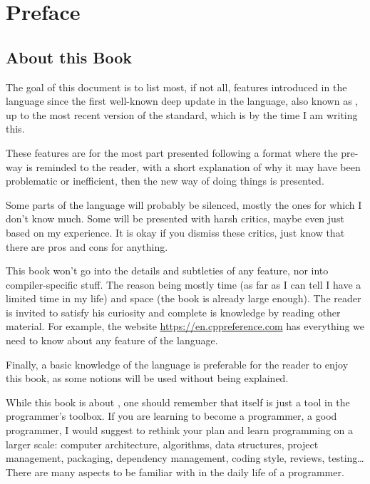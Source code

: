 \chapter{Preface}
\renewcommand*\thesection{\arabic{section}}

\section{About this Book}
The goal of this document is to list most, if not all, features
introduced in the \cpp{} language since the first well-known deep
update in the language, also known as , up to the most recent
version of the standard, which is  by the time I am writing
this.

These features are for the most part presented following a format
where the pre- way is reminded to the reader, with a short
explanation of why it may have been problematic or inefficient, then
the new way of doing things is presented.

Some parts of the language will probably be silenced, mostly the ones
for which I don't know much. Some will be presented with harsh
critics, maybe even just based on my experience. It is okay if you
dismiss these critics, just know that there are pros and cons for
anything.

This book won't go into the details and subtleties of any feature, nor
into compiler-specific stuff. The reason being mostly time (as far as
I can tell I have a limited time in my life) and space (the book is
already large enough). The reader is invited to satisfy his curiosity
and complete is knowledge by reading other material. For example, the
website \url{https://en.cppreference.com} has everything we need to
know about any feature of the language.

Finally, a basic knowledge of the language is preferable for the
reader to enjoy this book, as some notions will be used without being
explained.

\bigskip

While this book is about \cpp, one should remember that \cpp{} itself
is just a tool in the programmer's toolbox. If you are learning \cpp{}
to become a programmer, a good programmer, I would suggest to rethink
your plan and learn programming on a larger scale: computer
architecture, algorithms, data structures, project management,
packaging, dependency management, coding style, reviews, testing…
There are many aspects to be familiar with in the daily life of a
programmer.

